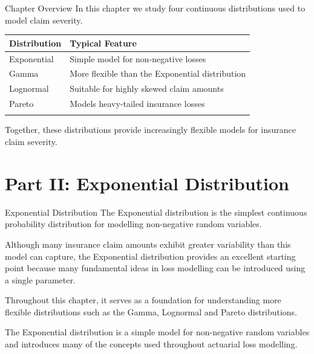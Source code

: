 \documentclass[
  ignorenonframetext,
  aspectratio=169,
]{beamer}
\newcounter{none} %
\begin{document}
\begin{frame}{Chapter Overview}
\protect{}\label{chapter-overview}
In this chapter we study four continuous distributions used to model
claim severity.

{\def\LTcaptype{none} %
\begin{longtable}[]{@{}ll@{}}
\toprule\noalign{}
Distribution & Typical Feature \\
\midrule\noalign{}
\endhead
Exponential & Simple model for non-negative losses \\
Gamma & More flexible than the Exponential distribution \\
Lognormal & Suitable for highly skewed claim amounts \\
Pareto & Models heavy-tailed insurance losses \\
\bottomrule\noalign{}
\end{longtable}
}

Together, these distributions provide increasingly flexible models for
insurance claim severity.
\end{frame}

\section{Part II: Exponential
Distribution}\label{part-ii-exponential-distribution}

\begin{frame}{Exponential Distribution}
\protect{}\label{exponential-distribution}
The Exponential distribution is the simplest continuous probability
distribution for modelling non-negative random variables.

Although many insurance claim amounts exhibit greater variability than
this model can capture, the Exponential distribution provides an
excellent starting point because many fundamental ideas in loss
modelling can be introduced using a single parameter.

Throughout this chapter, it serves as a foundation for understanding
more flexible distributions such as the Gamma, Lognormal and Pareto
distributions.

\begin{tcolorbox}[enhanced jigsaw, arc=.35mm, bottomrule=.15mm, bottomtitle=1mm, breakable, colback=white, colbacktitle=quarto-callout-note-color!10!white, colframe=quarto-callout-note-color-frame, coltitle=black, left=2mm, leftrule=.75mm, opacityback=0, opacitybacktitle=0.6, rightrule=.15mm, title=\textcolor{quarto-callout-note-color}{\faInfo}\hspace{0.5em}{Key Idea}, titlerule=0mm, toprule=.15mm, toptitle=1mm]

The Exponential distribution is a simple model for non-negative random
variables and introduces many of the concepts used throughout actuarial
loss modelling.

\end{tcolorbox}
\end{frame}
\end{document}
